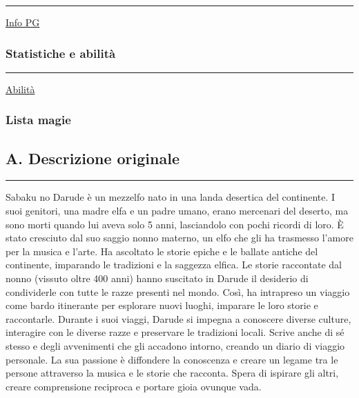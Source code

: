 \begin{center}\rule{0.5\linewidth}{0.5pt}\end{center}

\href{Info\%20PG\%200f2322afab24429cb360f81d9f366fbc.csv}{Info PG}

\subsubsection{Statistiche e abilità}\label{statistiche-e-abilituxe0}

\begin{center}\rule{0.5\linewidth}{0.5pt}\end{center}

\href{Abilita\%CC\%80\%207e175feb71844b54a1761ee14807b872.csv}{Abilità}

\subsubsection{Lista magie}\label{lista-magie}

\subsection{A. Descrizione originale}\label{a.-descrizione-originale}

\begin{center}\rule{0.5\linewidth}{0.5pt}\end{center}

Sabaku no Darude è un mezzelfo nato in una landa desertica del
continente. I suoi genitori, una madre elfa e un padre umano, erano
mercenari del deserto, ma sono morti quando lui aveva solo 5 anni,
lasciandolo con pochi ricordi di loro. È stato cresciuto dal suo saggio
nonno materno, un elfo che gli ha trasmesso l'amore per la musica e
l'arte. Ha ascoltato le storie epiche e le ballate antiche del
continente, imparando le tradizioni e la saggezza elfica. Le storie
raccontate dal nonno (vissuto oltre 400 anni) hanno suscitato in Darude
il desiderio di condividerle con tutte le razze presenti nel mondo.
Così, ha intrapreso un viaggio come bardo itinerante per esplorare nuovi
luoghi, imparare le loro storie e raccontarle. Durante i suoi viaggi,
Darude si impegna a conoscere diverse culture, interagire con le diverse
razze e preservare le tradizioni locali. Scrive anche di sé stesso e
degli avvenimenti che gli accadono intorno, creando un diario di viaggio
personale. La sua passione è diffondere la conoscenza e creare un legame
tra le persone attraverso la musica e le storie che racconta. Spera di
ispirare gli altri, creare comprensione reciproca e portare gioia
ovunque vada.
